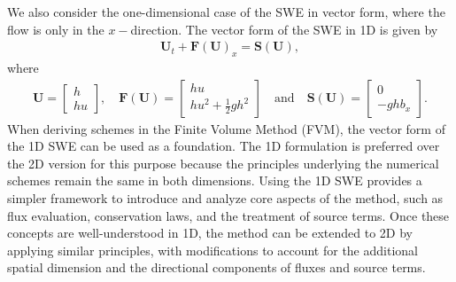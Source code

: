 We also consider the one-dimensional case of the SWE in vector form, where the flow is only in the $x-$direction.
The vector form of the SWE in 1D is given by
\begin{align}\label{eq:vector_form_1D}
    \mathbf{U}_t + \mathbf{F(U)}_x = \mathbf{S(U)},
\end{align}
where
\begin{align}\label{eq:vector_form_1D_variables}
    \mathbf{U} = \begin{bmatrix}
        h \\
        hu
    \end{bmatrix},
    \quad
    \mathbf{F(U)} = \begin{bmatrix}
        hu \\
        hu^2 + \frac{1}{2}gh^2
    \end{bmatrix}
    \quad
    \text{and} \quad
    \mathbf{S(U)} = \begin{bmatrix}
        0 \\
        -gh b_x
    \end{bmatrix}.
\end{align}
When deriving schemes in the Finite Volume Method (FVM), the vector form of the 1D SWE can be used as a foundation.
The 1D formulation is preferred over the 2D version for this purpose because the principles underlying the numerical schemes remain the same in both dimensions.
Using the 1D SWE provides a simpler framework to introduce and analyze core aspects of the method, such as flux evaluation, conservation laws, and the treatment of source terms.
Once these concepts are well-understood in 1D, the method can be extended to 2D by applying similar principles, with modifications to account for the additional spatial dimension and the directional components of fluxes and source terms.

